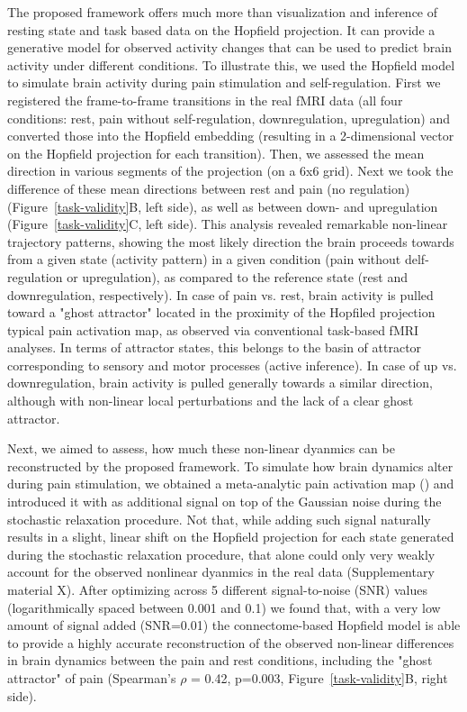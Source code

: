 \documentclass{article}
\begin{document}
The proposed framework offers much more than visualization and inference of resting state and task based data on the Hopfield projection.
It can provide a generative model for observed activity changes that can be used to predict brain activity under different conditions. To illustrate this, we used the Hopfield model to simulate brain activity during pain stimulation and self-regulation.
First we registered the frame-to-frame transitions in the real fMRI data (all four conditions: rest, pain without self-regulation, downregulation, upregulation) and converted those into the Hopfield embedding (resulting in a 2-dimensional vector on the Hopfield projection for each transition). Then, we assessed the mean direction in various segments of the projection (on a 6x6 grid). Next we took the difference of these mean directions between rest and pain (no regulation) (Figure~\ref{task-validity}B, left side), as well as between down- and upregulation (Figure~\ref{task-validity}C, left side). This analysis revealed remarkable non-linear trajectory patterns, showing the most likely direction the brain proceeds towards from a given state (activity pattern) in a given condition (pain without delf-regulation or upregulation), as compared to the reference state (rest and downregulation, respectively). In case of pain vs. rest, brain activity is pulled toward a "ghost attractor" located in the proximity of the Hopfiled projection typical pain activation map, as observed via conventional task-based fMRI analyses. In terms of attractor states, this belongs to the basin of attractor corresponding to sensory and motor processes (active inference). In case of up vs. downregulation, brain activity is pulled generally towards a similar direction, although with non-linear local perturbations and the lack of a clear ghost attractor.

Next, we aimed to assess, how much these non-linear dyanmics can be reconstructed by the proposed framework. To simulate how brain dynamics alter during pain stimulation, we obtained a meta-analytic pain activation map (\cite{Zunhammer_2021}) and introduced it with as additional signal on top of the Gaussian noise during the stochastic relaxation procedure. Not that, while adding such signal naturally results in a slight, linear shift on the Hopfield projection for each state generated during the stochastic relaxation procedure, that alone could only very weakly account for the observed nonlinear dyanmics in the real data (Supplementary material X). After optimizing across 5 different signal-to-noise (SNR) values (logarithmically spaced between 0.001 and 0.1) we found that, with a very low amount of signal added (SNR=0.01) the connectome-based Hopfield model is able to provide a highly accurate reconstruction of the observed non-linear differences in brain dynamics between the pain and rest conditions, including the "ghost attractor" of pain (Spearman's $\rho$ = 0.42, p=0.003, Figure~\ref{task-validity}B, right side).
\end{document}
